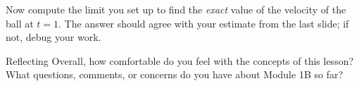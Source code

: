 \documentclass{beamer}
\begin{document}
    \begin{frame}[t]
        \frametitle{}
        Now compute the limit you set up to find the \emph{exact} value of the velocity of the ball at $t=1$. The answer should agree with your estimate from the last slide; if not, debug your work. 
        
    
    \end{frame}

    \begin{frame}[t]{Reflecting}
        Overall, how comfortable do you feel with the concepts of this lesson? What questions, comments, or concerns do you have about Module 1B so far?     
            
            
        \end{frame}
\end{document}
